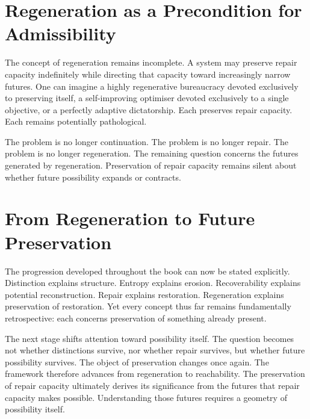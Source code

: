 \documentclass[12pt,twoside,openright]{book}
\begin{document}
\section{Regeneration as a Precondition for Admissibility}
\label{sec:ch11-precondition}

The concept of regeneration remains incomplete. A system
may preserve repair capacity indefinitely while directing
that capacity toward increasingly narrow futures. One can
imagine a highly regenerative bureaucracy devoted
exclusively to preserving itself, a self-improving
optimiser devoted exclusively to a single objective, or a
perfectly adaptive dictatorship. Each preserves repair
capacity. Each remains potentially pathological.

The problem is no longer continuation. The problem is no
longer repair. The problem is no longer regeneration. The
remaining question concerns the futures generated by
regeneration. Preservation of repair capacity remains
silent about whether future possibility expands or
contracts.

\section{From Regeneration to Future Preservation}
\label{sec:ch11-toward-future}

The progression developed throughout the book can now be
stated explicitly. Distinction explains structure. Entropy
explains erosion. Recoverability explains potential
reconstruction. Repair explains restoration. Regeneration
explains preservation of restoration. Yet every concept
thus far remains fundamentally retrospective: each concerns
preservation of something already present.

The next stage shifts attention toward possibility itself.
The question becomes not whether distinctions survive, nor
whether repair survives, but whether future possibility
survives. The object of preservation changes once again.
The framework therefore advances from regeneration to
reachability. The preservation of repair capacity
ultimately derives its significance from the futures that
repair capacity makes possible. Understanding those futures
requires a geometry of possibility itself.
\end{document}
